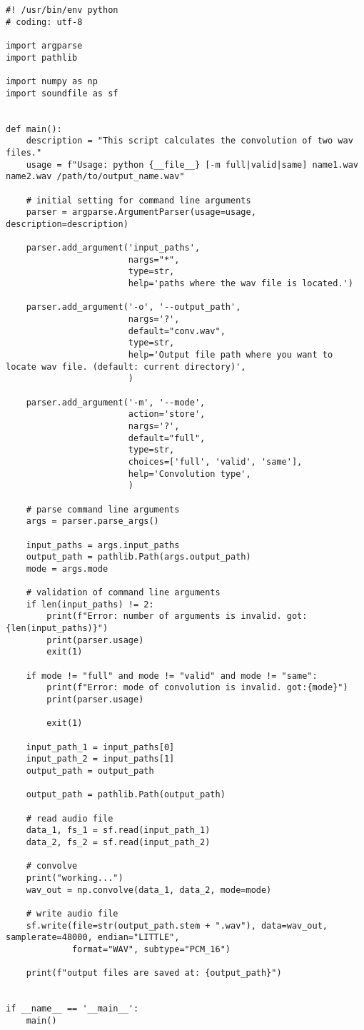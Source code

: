 \begin{lstlisting}[caption=calc\_convolution\_wav.py,label=calc\_convolution\_wav.py]
#! /usr/bin/env python
# coding: utf-8

import argparse
import pathlib

import numpy as np
import soundfile as sf


def main():
    description = "This script calculates the convolution of two wav files."
    usage = f"Usage: python {__file__} [-m full|valid|same] name1.wav name2.wav /path/to/output_name.wav"

    # initial setting for command line arguments
    parser = argparse.ArgumentParser(usage=usage, description=description)

    parser.add_argument('input_paths',
                        nargs="*",
                        type=str,
                        help='paths where the wav file is located.')

    parser.add_argument('-o', '--output_path',
                        nargs='?',
                        default="conv.wav",
                        type=str,
                        help='Output file path where you want to locate wav file. (default: current directory)',
                        )

    parser.add_argument('-m', '--mode',
                        action='store',
                        nargs='?',
                        default="full",
                        type=str,
                        choices=['full', 'valid', 'same'],
                        help='Convolution type',
                        )

    # parse command line arguments
    args = parser.parse_args()

    input_paths = args.input_paths
    output_path = pathlib.Path(args.output_path)
    mode = args.mode

    # validation of command line arguments
    if len(input_paths) != 2:
        print(f"Error: number of arguments is invalid. got:{len(input_paths)}")
        print(parser.usage)
        exit(1)

    if mode != "full" and mode != "valid" and mode != "same":
        print(f"Error: mode of convolution is invalid. got:{mode}")
        print(parser.usage)

        exit(1)

    input_path_1 = input_paths[0]
    input_path_2 = input_paths[1]
    output_path = output_path

    output_path = pathlib.Path(output_path)

    # read audio file
    data_1, fs_1 = sf.read(input_path_1)
    data_2, fs_2 = sf.read(input_path_2)

    # convolve
    print("working...")
    wav_out = np.convolve(data_1, data_2, mode=mode)

    # write audio file
    sf.write(file=str(output_path.stem + ".wav"), data=wav_out, samplerate=48000, endian="LITTLE",
             format="WAV", subtype="PCM_16")

    print(f"output files are saved at: {output_path}")


if __name__ == '__main__':
    main()
\end{lstlisting}

